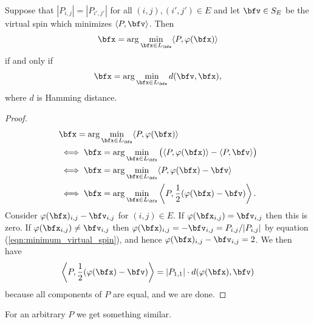 \documentclass[raggedright, nofonts, notitlepage, openany, debug]{tufte-book}
\begin{document}
\begin{prop}\label{prop:hamming_distance_to_minimum_virtual_spin}
  Suppose that $|P_{i,j}| = |P_{i',j'}|$ for all $(i,j), (i',j') \in E$ and let $\bfv \in S_E$ be the virtual spin which minimizes $\langle P, \bfv \rangle$. Then
  \begin{align*}
    \bfx = \arg\min_{\bfx \in L_\bfs} \langle P, \varphi(\bfx) \rangle
  \end{align*}
  if and only if
  \begin{align*}
    \bfx = \arg\min_{\bfx \in L_{\bfs}} d(\bfv, \bfx),
  \end{align*}
  where $d$ is Hamming distance.
\end{prop}
\begin{proof}
  \begin{align*} 
    &\bfx = \arg\min_{\bfx \in L_\bfs} \langle P, \varphi(\bfx) \rangle \\
    &\iff \bfx = \arg\min_{\bfx \in L_\bfs} \big(\langle P, \varphi(\bfx) \rangle - \langle P, \bfv \rangle\big)\\
    &\iff \bfx = \arg\min_{\bfx \in L_\bfs} \langle P, \varphi(\bfx) - \bfv \rangle \\
    &\iff \bfx = \arg\min_{\bfx \in L_\bfs} \left\langle P, \frac{1}{2}(\varphi(\bfx) - \bfv) \right\rangle.
  \end{align*}
  Consider $\varphi(\bfx)_{i,j} - \bfv_{i,j}$ for $(i,j) \in E$. If $\varphi(\bfx_{i,j}) = \bfv_{i,j}$ then this is zero. If $\varphi(\bfx_{i,j}) \neq \bfv_{i,j}$ then $\varphi(\bfx)_{i,j} = - \bfv_{i,j} = P_{i,j}/|P_{i,j}|$ by equation (\ref{eqn:minimum_virtual_spin}), and hence $\varphi(\bfx)_{i,j} - \bfv_{i,j} = 2$. We then have
  \begin{align*}
    \left\langle P, \frac{1}{2}(\varphi(\bfx) - \bfv) \right\rangle = |P_{1,1}| \cdot d(\varphi(\bfx), \bfv)
  \end{align*}
  because all components of $P$ are equal, and we are done.
\end{proof}

For an arbitrary $P$ we get something similar.
\end{document}
